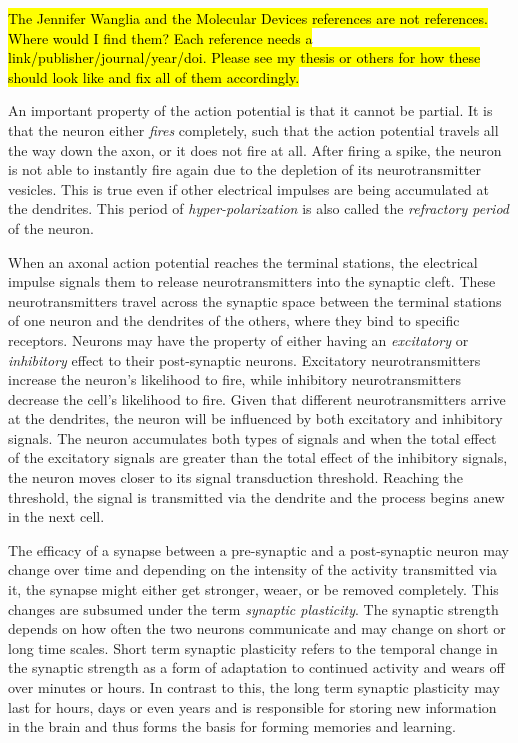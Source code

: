 \hl{The Jennifer Wanglia and the Molecular Devices references are not references. Where would I find them? Each reference needs a link/publisher/journal/year/doi. Please see my thesis or others for how these should look like and fix all of them accordingly.}

An important property of the action potential is that it cannot be partial. It is that the neuron either \emph{fires} completely, such that the action potential travels all the way down the axon, or it does not fire at all. After firing a spike, the neuron is not able to instantly fire again due to the depletion of its neurotransmitter vesicles. This is true even if other electrical impulses are being accumulated at the dendrites. This period of \emph{hyper-polarization} is also called the \emph{refractory period} of the neuron.

When an axonal action potential reaches the terminal stations, the electrical impulse signals them to release neurotransmitters into the synaptic cleft. These neurotransmitters travel across the synaptic space between the terminal stations of one neuron and the dendrites of the others, where they bind to specific receptors. Neurons may have the property of either having an \emph{excitatory} or \emph{inhibitory} effect to their post-synaptic neurons. Excitatory neurotransmitters increase the neuron's likelihood to fire, while inhibitory neurotransmitters decrease the cell's likelihood to fire. Given that different neurotransmitters arrive at the dendrites, the neuron will be influenced by both excitatory and inhibitory signals. The neuron accumulates both types of signals and when the total effect of the excitatory signals are greater than the total effect of the inhibitory signals, the neuron moves closer to its signal transduction threshold. Reaching the threshold, the signal is transmitted via the dendrite and the process begins anew in the next cell.

The efficacy of a synapse between a pre-synaptic and a post-synaptic neuron may change over time and depending on the intensity of the activity transmitted via it, the synapse might either get stronger, weaer, or be removed completely. This changes are subsumed under the term \emph{synaptic plasticity}. The synaptic strength depends on how often the two neurons communicate and may change on short or long time scales. Short term synaptic plasticity refers to the temporal change in the synaptic strength as a form of adaptation to continued activity and wears off over minutes or hours. In contrast to this, the long term synaptic plasticity may last for hours, days or even years and is responsible for storing new information in the brain and thus forms the basis for forming memories and learning.

